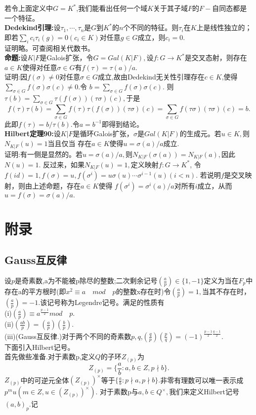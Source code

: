 \documentclass[UTF8]{article}
\begin{document}
    若令上面定义中$G=K^{*}$,我们能看出任何一个域$K$关于其子域$F$的$F-$自同态都是一个特征。\\
    \textbf{Dedekind引理:}设$\tau_{1},\cdots,\tau_{n}$是$G$到$K^{*}$的$n$个不同的特征。则$\tau_{i}$在$K$上是线性独立的；即若$\sum_{i}c_{i}\tau_{i}(g)=0(c_{i}\in K)$对任意$g\in G$成立，则$c_{i}=0.$\\
    证明略。可查阅相关代数书。\\
   \textbf{命题:}设$K|F$是Galois扩张，令$G=Gal(K|F),$设$f:G\rightarrow K^{*}$是交叉态射，则存在$a\in K$使得对任意$\sigma \in G$有$f(\tau)=\tau(a)/a.$\\
   证明:因$f(\sigma)\neq 0$对任意$\sigma\in G$成立,故由Dedekind无关性引理存在$c\in K$,使得$\sum_{\sigma \in G}f(\sigma)\sigma(c)\neq 0.$令
   $b=\sum_{\sigma \in G}f(\sigma)\sigma(c).$
   则$\tau(b)=\sum_{\sigma \in G}\tau(f(\sigma))(\tau\sigma)(c),$于是
   $$
   f(\tau)\tau(b)=\sum_{\sigma \in G}f(\tau)\tau(f(\sigma))(\tau\sigma)(c)
   =\sum_{\sigma \in G}f(\tau\sigma)(\tau\sigma)(c)=b.
   $$
   此即$f(\tau)=b/\tau(b).$令$a=b^{-1}$即得到结论。\\
   \textbf{Hilbert定理90:}设$K|F$是循环Galois扩张，$\sigma$是$Gal(K|F)$的生成元。若$u\in K,$则$N_{K|F}(u)=1$当且仅当
   存在$a\in K$使得$u=\sigma(a)/a$成立.\\
   
   证明:有一侧是显然的。若$u=\sigma(a)/a,$则$N_{K|F}(\sigma(a))=N_{K|F}(a),$因此$N(u)=1.$
   反过来，如果$N_{K|F}(u)=1,$定义映射$f:G\rightarrow K^{*}$,
   令$f(id)=1,f(\sigma)=u,f(\sigma^{i})=u\sigma(u)\cdots\sigma^{i-1}(u)(i<n)$.
   若说明$f$是交叉映射，则由上述命题，存在$a\in K$使得
   $f(\sigma^{i})=\sigma^{i}(a)/a$对所有$i$成立，从而$u=f(\sigma)=\sigma(a)/a.$\\
   
   
   
     \section{附录}
 \subsection{Gauss互反律}
   设$p$是奇素数,a为不能被p除尽的整数;二次剩余记号$(\frac{a}{p})\in \{1,-1\}$定义为当在$F_{p}$中存在a的平方根时(即$x^{2}\equiv a \quad mod \quad p$的整数x存在时)令$(\frac{a}{p})=1,$当其不存在时，$(\frac{a}{p})=-1.$该记号称为Legendre记号。满足的性质有\\
   (i)$(\frac{a}{p})\equiv a^{\frac{p-1}{2}}mod \quad p.$\\
   (ii)$(\frac{ab}{p})=(\frac{a}{p})(\frac{b}{p}).$\\
   (iii)(Gauss互反律.)对于两个不同的奇素数$p,q$,$(\frac{q}{p})(\frac{p}{q})=(-1)^{\frac{p-1}{2}\frac{q-1}{2}}.$\\
 下面引入Hilbert记号。\\
 首先做些准备.对于素数p,定义$Q$的子环$Z_{(p)}$为$$
 Z_{(p)}=\{\frac{a}{b}:a,b\in Z,p\nmid b\}.
 $$
 $Z_{(p)}$中的可逆元全体$(Z_{(p)})^{\times}$等于$\{\frac{a}{b}:p\nmid a,p\nmid b\}.$非零有理数可以唯一表示成$p^{m}u(m\in Z,u\in (Z_{(p)})^{\times}).$
 对于素数p与$a,b\in Q^{\times},$我们来定义Hilbert记号$(a,b)_{p}.$记
 
\end{document}
